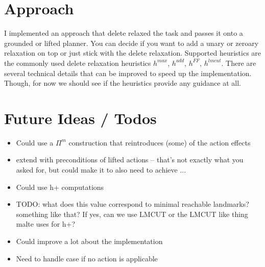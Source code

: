 \documentclass[twocolumn]{article}
\newcommand{\task}{\ensuremath{\Pi}\xspace}
\begin{document}
	\section{Approach}
	
	I implemented an approach that delete relaxed the task and passes it onto a grounded or lifted planner.
	You can decide if you want to add a unary or zeroary relaxation on top or just stick with the delete relaxation.
	Supported heuristics are the commonly used delete relaxation heuristics $h^{max}$, $h^{add}$, $h^{FF}$, $h^{lmcut}$.
	There are several technical details that can be improved to speed up the implementation.
	Though, for now we should see if the heuristics provide any guidance at all.
		
	\section{Future Ideas / Todos}
	
	\begin{itemize}
		\item Could use a $\task^{m}$ construction that reintroduces (some) of the action effects
		\item extend with preconditions of lifted actions -- that's not exactly what you asked for, but could make it to also need to achieve ... 
		\item Could use h+ computations
		\item 
		TODO: what does this value correspond to minimal reachable landmarks? something like that? If yes, can we use LMCUT or the LMCUT like thing malte uses for h+?
		\item Could improve a lot about the implementation
		\item Need to handle case if no action is applicable
	\end{itemize}
	
	
	
	
\end{document}
